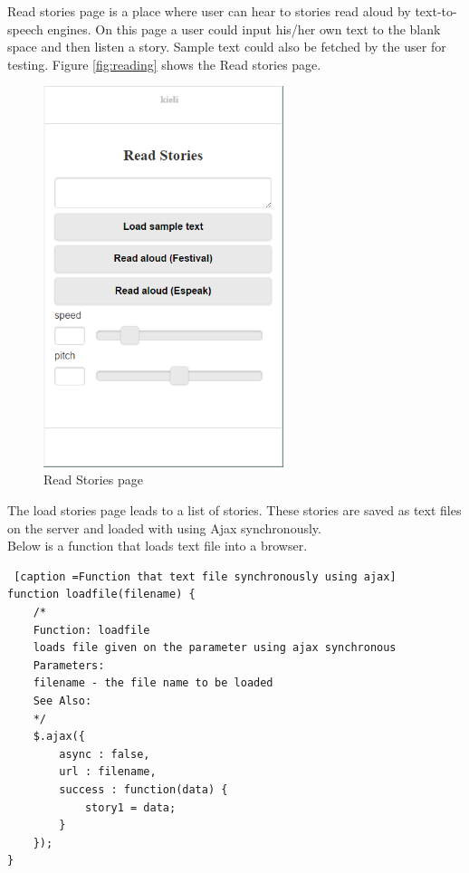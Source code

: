 \documentclass[11pt,a4paper,oneside,article]{memoir}
\begin{document}
Read stories page is a place where user can hear to stories read aloud by text-to-speech engines. On this page a user could input his/her own text to the blank space and then listen a story. Sample text could also be fetched by the user for testing. Figure  \vref{fig:reading} shows the Read stories page.

\begin{figure}[!ht]
\includegraphics[width=7cm]{reading}
\caption{ Read Stories page}
\label{fig:reading}
\end{figure}

The load stories page leads to a list of stories. These stories are saved as text files on the server and loaded with using Ajax synchronously. \\ Below is a function that loads text file into a browser.


\begin{minipage}{\linewidth}
\begin{lstlisting} [caption =Function that text file synchronously using ajax]
function loadfile(filename) {
    /*
    Function: loadfile
    loads file given on the parameter using ajax synchronous
    Parameters:
    filename - the file name to be loaded                            
    See Also:       
    */
    $.ajax({
        async : false,
        url : filename,
        success : function(data) {
            story1 = data;
        }
    });
}

\end{lstlisting}
\end{minipage}
\end{document}
